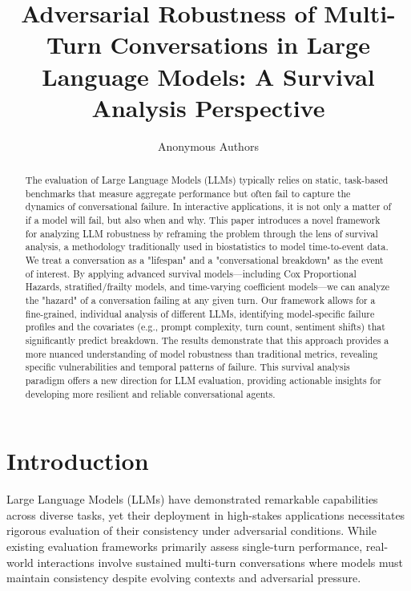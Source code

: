\documentclass[letterpaper]{article}
\title{Adversarial Robustness of Multi-Turn Conversations in Large Language Models: A Survival Analysis Perspective}
\author{
    Anonymous Authors
}
\begin{document}
\maketitle

\begin{abstract}
The evaluation of Large Language Models (LLMs) typically relies on static, task-based benchmarks that measure aggregate performance but often fail to capture the dynamics of conversational failure. In interactive applications, it is not only a matter of if a model will fail, but also when and why. This paper introduces a novel framework for analyzing LLM robustness by reframing the problem through the lens of survival analysis, a methodology traditionally used in biostatistics to model time-to-event data. We treat a conversation as a "lifespan" and a "conversational breakdown" as the event of interest. By applying advanced survival models—including Cox Proportional Hazards, stratified/frailty models, and time-varying coefficient models—we can analyze the "hazard" of a conversation failing at any given turn. Our framework allows for a fine-grained, individual analysis of different LLMs, identifying model-specific failure profiles and the covariates (e.g., prompt complexity, turn count, sentiment shifts) that significantly predict breakdown. The results demonstrate that this approach provides a more nuanced understanding of model robustness than traditional metrics, revealing specific vulnerabilities and temporal patterns of failure. This survival analysis paradigm offers a new direction for LLM evaluation, providing actionable insights for developing more resilient and reliable conversational agents.
\end{abstract}

\begin{links}
\end{links}

\section{Introduction}

Large Language Models (LLMs) have demonstrated remarkable capabilities across diverse tasks, yet their deployment in high-stakes applications necessitates rigorous evaluation of their consistency under adversarial conditions. While existing evaluation frameworks primarily assess single-turn performance, real-world interactions involve sustained multi-turn conversations where models must maintain consistency despite evolving contexts and adversarial pressure.
\end{document}
